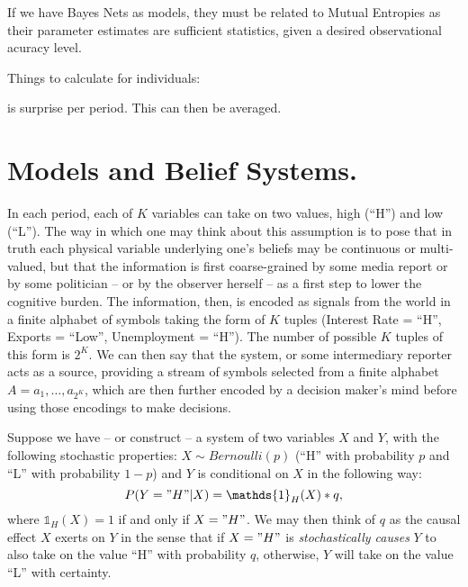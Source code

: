 \documentclass[11pt]{article}
\begin{document}
If we have Bayes Nets as models, they must be related to Mutual Entropies as their parameter estimates are sufficient statistics, given a desired observational acuracy level.  

Things to calculate for individuals:

is surprise per period. This can then be averaged. 
 
\section{Models and Belief Systems.}
In each period, each of $K$ variables can take on two values, high (``H'') and low (``L'').  The way in which one may think about this assumption is to pose that in truth each physical variable underlying one's beliefs may be continuous or multi-valued, but that the information is first coarse-grained by some media report or by some politician -- or by the observer herself -- as a first step to lower the cognitive burden. The information, then, is encoded as signals from the world in a finite alphabet of symbols taking the form of $K$ tuples (Interest Rate = ``H'', Exports = ``Low'', Unemployment = ``H''). The number of possible $K$ tuples of this form is $2^K$. We can then say that the system, or some intermediary reporter acts as a source, providing a stream of symbols selected from a finite alphabet $A=a_1, \ldots, a_{2^K}$, which are then further encoded by a decision maker's mind before using those encodings to make decisions. 

Suppose we have -- or construct -- a system of two variables $X$ and $Y$, with the following stochastic properties:
$X \sim Bernoulli(p)$ (``H'' with probability $p$ and ``L'' with probability $1-p$) and $Y$ is conditional on $X$ in the following way:
\begin{equation}
P(Y="H"|X)=\mathds{1}_H(X)*q,
\end{equation}    
where $\mathds{1}_H(X)=1$ if and only if $X="H"$. We may then think of $q$ as the causal effect $X$ exerts on $Y$ in the sense that if $X="H"$ is \textit{stochastically causes} $Y$ to also take on the value ``H'' with probability $q$, otherwise, $Y$ will take on the value ``L'' with certainty.  
\end{document}
